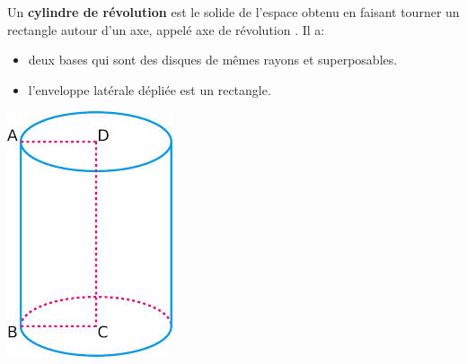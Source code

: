  
\begin{minipage}{0.48\linewidth}
Un \textbf{cylindre de révolution} est le solide de l'espace obtenu en faisant tourner un rectangle autour d'un axe, appelé \og axe de révolution \fg{}. Il a:
\begin{itemize}
\item deux bases qui sont des disques de mêmes rayons et superposables.
\item l'enveloppe latérale \og dépliée \fg{} est un rectangle. 
\end{itemize}
\end{minipage} 
\hfill
\begin{minipage}{0.48\linewidth}
\includegraphics[scale=0.5]{RepS-cylindre.jpg} 
\end{minipage} 